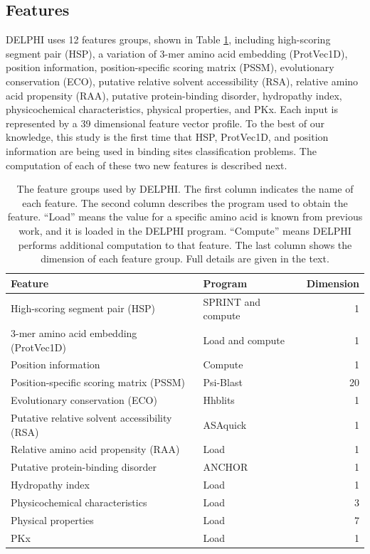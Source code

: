 \subsection{Features}
DELPHI uses 12 features groups, shown in Table \ref{tab_feture}, including high-scoring segment pair (HSP), a variation of 3-mer amino acid embedding (ProtVec1D), position information, position-specific scoring matrix (PSSM), evolutionary conservation (ECO), putative relative solvent accessibility (RSA), relative amino acid propensity (RAA), putative protein-binding disorder, hydropathy index, physicochemical characteristics, physical properties, and PKx. Each input is represented by a 39 dimensional feature vector profile. To the best of our knowledge, this study is the first time that HSP, ProtVec1D, and position information are being used in binding sites classification problems. The computation of each of these two new features is described next.

\begin{table}[htbp]
  \centering
  \caption{The feature groups used by DELPHI. The first column indicates the name of each feature. The second column describes the program used to obtain the feature. ``Load'' means the value for a specific amino acid is known from previous work, and it is loaded in the DELPHI program. ``Compute'' means DELPHI performs additional computation to that feature. The last column shows the dimension of each feature group. Full details are given in the text.}
    \begin{tabular}{p{20.93em}p{11em}r}
    \toprule
    Feature & Program & \multicolumn{1}{p{5.145em}}{Dimension} \\
    \midrule
    High-scoring segment pair (HSP) & SPRINT and compute & 1 \\
    3-mer amino acid embedding (ProtVec1D) & Load and compute & 1 \\
    Position information & Compute & 1 \\
    Position-specific scoring matrix (PSSM) & Psi-Blast & 20 \\
    Evolutionary conservation (ECO) & Hhblits & 1 \\
    Putative relative solvent accessibility (RSA) & ASAquick & 1 \\
    Relative amino acid propensity (RAA) & Load  & 1 \\
    Putative protein-binding disorder & ANCHOR & 1 \\
    Hydropathy index & Load  & 1 \\
    Physicochemical characteristics & Load  & 3 \\
    Physical properties & Load  & 7 \\
    PKx   & Load  & 1 \\
    \bottomrule
    \end{tabular}%
  \label{tab_feture}%
\end{table}%

